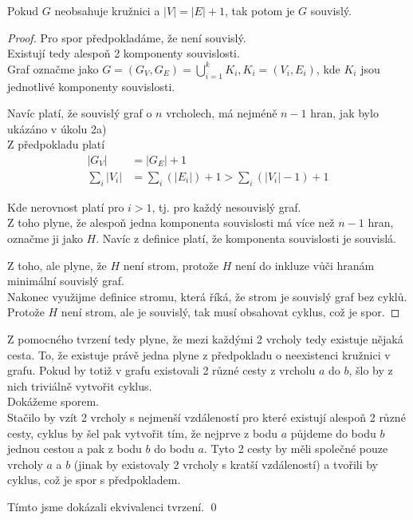 \documentclass[../main.tex]{subfiles}
\begin{document}
\begin{lemma*}
    Pokud $G$ neobsahuje kružnici a $|V| = |E| + 1$, tak potom je $G$ souvislý.
\end{lemma*}
\begin{proof}
Pro spor předpokladáme, že není souvislý. \\
Existují tedy alespoň 2 komponenty souvislosti.\\
Graf označme jako $G = (G_V, G_E) = \bigcup_{i=1}^k K_i, K_i = (V_i, E_i)$, kde $K_i$ jsou jednotlivé komponenty souvislosti.

Navíc platí, že souvislý graf o $n$ vrcholech, má nejméně $n - 1$ hran, jak bylo ukázáno v úkolu 2a) \\
Z předpokladu platí \begin{align*}
    |G_V| &= |G_E| + 1\\
    \sum_{i} |V_i| &= \sum_i (|E_i|) + 1 > \sum_i (|V_i| - 1) + 1  
\end{align*}

Kde nerovnost platí pro $i>1$, tj. pro každý nesouvislý graf.\\
Z toho plyne, že alespoň jedna komponenta souvislosti má více než $n-1$ hran, označme ji jako $H$.
Navíc z definice platí, že komponenta souvislosti je souvislá.

Z toho, ale plyne, že $H$ není strom, protože $H$ není do inkluze vůči hranám minimální souvislý graf.\\
Nakonec využijme definice stromu, která říká, že strom je souvislý graf bez cyklů.
Protože $H$ není strom, ale je souvislý, tak musí obsahovat cyklus, což je spor.
\end{proof}


Z pomocného tvrzení tedy plyne, že mezi každými 2 vrcholy tedy existuje nějaká cesta. To, že existuje právě jedna plyne z předpokladu o neexistenci kružnici v grafu.
Pokud by totiž v grafu existovali 2 různé cesty z vrcholu $a$ do $b$, šlo by z nich triviálně vytvořit cyklus. \\Dokážeme sporem.\\
Stačilo by vzít 2 vrcholy s nejmenší vzdáleností pro které existují alespoň 2 různé cesty, cyklus by šel pak vytvořit tím, že nejprve z bodu $a$ půjdeme do bodu $b$ jednou cestou a pak z bodu $b$ do bodu $a$.
Tyto 2 cesty by měli společné pouze vrcholy $a$ a $b$ (jinak by existovaly 2 vrcholy s kratší vzdáleností) a tvořili by cyklus, což je spor s předpokladem.



Tímto jsme dokázali ekvivalenci tvrzení.
\qed
\end{document}
